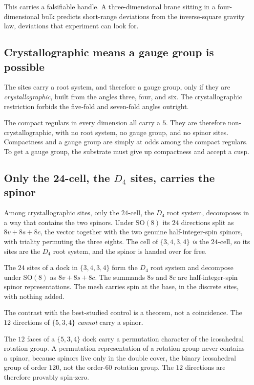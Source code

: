 This carries a falsifiable handle. A three-dimensional brane sitting in a four-dimensional bulk predicts short-range deviations from the inverse-square gravity law, deviations that experiment can look for.

\subsection{Crystallographic means a gauge group is possible}

The sites carry a root system, and therefore a gauge group, only if they are \emph{crystallographic}, built from the angles three, four, and six. The crystallographic restriction forbids the five-fold and seven-fold angles outright.

The compact regulars in every dimension all carry a $5$. They are therefore non-crystallographic, with no root system, no gauge group, and no spinor sites. Compactness and a gauge group are simply at odds among the compact regulars. To get a gauge group, the substrate must give up compactness and accept a cusp.

\subsection{Only the 24-cell, the $D_4$ sites, carries the spinor}

Among crystallographic sites, only the $24$-cell, the $D_4$ root system, decomposes in a way that contains the two spinors. Under $\mathrm{SO}(8)$ its $24$ directions split as $8v + 8s + 8c$, the vector together with the two genuine half-integer-spin spinors, with triality permuting the three eights. The cell of $\{3,4,3,4\}$ \emph{is} the $24$-cell, so its sites are the $D_4$ root system, and the spinor is handed over for free.

\begin{proposition}
The $24$ sites of a dock in $\{3,4,3,4\}$ form the $D_4$ root system and decompose under $\mathrm{SO}(8)$ as $8v + 8s + 8c$. The summands $8s$ and $8c$ are half-integer-spin spinor representations. The mesh carries spin at the base, in the discrete sites, with nothing added.
\end{proposition}

The contrast with the best-studied control is a theorem, not a coincidence. The $12$ directions of $\{5,3,4\}$ \emph{cannot} carry a spinor.

\begin{lemma}
The $12$ faces of a $\{5,3,4\}$ dock carry a permutation character of the icosahedral rotation group. A permutation representation of a rotation group never contains a spinor, because spinors live only in the double cover, the binary icosahedral group of order $120$, not the order-$60$ rotation group. The $12$ directions are therefore provably spin-zero.
\end{lemma}

